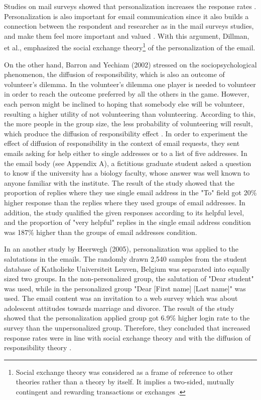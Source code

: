 Studies on mail surveys showed that personalization increases the response rates \cite{Dillman1991,Schaefer1998}. Personalization is also important for email communication since it also builds a connection between the respondent and researcher as in the mail surveys studies, and make them feel more important and valued \cite[page 272]{DillmanDonA.SmythJoleneD.Christian2009}. With this argument, Dillman, et al., emphasized the social exchange theory\footnote{Social exchange theory was considered as a frame of reference to other theories rather than a theory by itself. It implies a two-sided, mutually contingent and rewarding transactions or exchanges \cite{Emerson1976}.} of the personalization of the email.
\vspace{1cm}

On the other hand, Barron and Yechiam (2002) stressed on the sociopsychological phenomenon, the diffusion of responsibility, which is also an outcome of volunteer's dilemma. In the volunteer's dilemma one player is needed to volunteer in order to reach the outcome preferred by all the others in the game. However, each person might be inclined to hoping that somebody else will be volunteer, resulting a higher utility of not volunteering than volunteering. According to this, the more people in the group size, the less probability of volunteering will result, which produce the diffusion of responsibility effect \cite{Barron2002}. In order to experiment the effect of diffusion of responsibility in the context of email requests, they sent emails asking for help either to single addresses or to a list of five addresses. In the email body (see Appendix A), a fictitious graduate student asked a question to know if the university has a biology faculty, whose answer was well known to anyone familiar with the institute. The result of the study showed that the proportion of replies where they use single email address in the "To" field got 20\% higher response than the replies where they used groups of email addresses. In addition, the study qualified the given responses according to its helpful level, and the proportion of "very helpful" replies in the single email address condition was 187\% higher than the groups of email addresses condition.
\vspace{1cm}

In an another study by Heerwegh (2005), personalization was applied to the salutations in the emails. The randomly drawn 2,540 samples from the student database of Katholieke Universiteit Leuven, Belgium was separated into equally sized two groups. In the non-personalized group, the salutation of "Dear student" was used, while in the personalized group "Dear [First name] [Last name]" was used. The email content was an invitation to a web survey which was about adolescent attitudes towards marriage and divorce. The result of the study showed that the personalization applied group got 6.9\% higher login rate to the survey than the unpersonalized group. Therefore, they concluded that increased response rates were in line with social exchange theory and with the diffusion of responsibility theory \cite{Heerwegh2005}.
\vspace{1cm}

